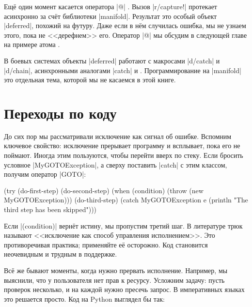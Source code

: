 
Ещё один момент касается оператора \spverb|@| . Вызов
\spverb|r/capture!| протекает асинхронно за счёт библиотеки
\spverb|manifold|. Результат это особый объект \spverb|deferred|, похожий на
футуру. Даже если в нём случилась ошибка, мы не узнаем этого, пока не
<<дерефнем>> его. Оператор \spverb|@| мы обсудим в следующей главе на примере
атома .

В боевых системах объекты \spverb|deferred| работают с макросами
\spverb|d/catch| и \spverb|d/chain|, асинхронными аналогами \spverb|catch| и
\arr{}. Программирование на \spverb|manifold| это отдельная тема, которой мы не
касаемся в этой книге.

\section{Переходы по коду}


До сих пор мы рассматривали исключение как сигнал об ошибке. Вспомним ключевое
свойство: исключение прерывает программу и всплывает, пока его не
поймают. Иногда этим пользуются, чтобы перейти вверх по стеку. Если бросить
условное \spverb|MyGOTOException|, а сверху поставить \spverb|catch| с этим
классом, получим оператор \spverb|GOTO|:

\begin{english}
  \begin{clojure}
(try
  (do-first-step)
  (do-second-step)
  (when (condition)
    (throw (new MyGOTOException)))
  (do-third-step)
  (catch MyGOTOException e
    (println "The third step has been skipped")))
  \end{clojure}
\end{english}

Если \spverb|(condition)| верн\"{е}т истину, мы пропустим третий шаг. В литературе
трюк называют <<исключение как способ управления исполнением>>. Это
противоречивая практика; применяйте е\"{е} осторожно. Код становится неочевидным и
трудным в поддержке.


Вс\"{е} же бывают моменты, когда нужно прервать исполнение. Например, мы
выяснили, что у пользователя нет прав к ресурсу. Усложним задачу: пусть проверок
несколько, и на каждой нужно пресечь запрос. В императивных языках это решается
просто. Код на Python выглядел бы так:


